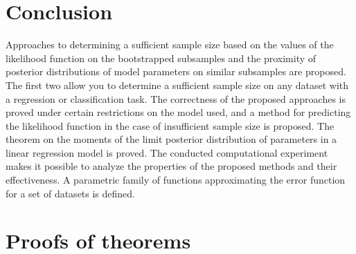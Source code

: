 \documentclass[
11pt,%
tightenlines,%
twoside,%
onecolumn,%
nofloats,%
nobibnotes,%
nofootinbib,%
superscriptaddress,%
noshowpacs,%
centertags]%
{revtex4-2}
\begin{document}
\section{Conclusion}

Approaches to determining a sufficient sample size based on the values of the likelihood function on the bootstrapped subsamples and the proximity of posterior distributions of model parameters on similar subsamples are proposed. The first two allow you to determine a sufficient sample size on any dataset with a regression or classification task. The correctness of the proposed approaches is proved under certain restrictions on the model used, and a method for predicting the likelihood function in the case of insufficient sample size is proposed. The theorem on the moments of the limit posterior distribution of parameters in a linear regression model is proved. The conducted computational experiment makes it possible to analyze the properties of the proposed methods and their effectiveness. A parametric family of functions approximating the error function for a set of datasets is defined.

\appendix

\section{Proofs of theorems}\label{append}
\end{document}
